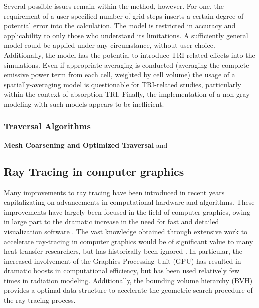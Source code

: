Several possible issues remain within the method, however. For one, the requirement of a user specified number of grid steps inserts a certain degree of potential error into the calculation. 
The model is restricted in accuracy and applicability to only those who understand its limitations. A sufficiently general model could be applied under any circumstance, without user choice.
Additionally, the model has the potential to introduce TRI-related effects into the simulations. 
Even if appropriate averaging is conducted (averaging the complete emissive power term from each cell, weighted by cell volume) the usage of a spatially-averaging model is questionable for TRI-related studies, particularly within the context of absorption-TRI.
Finally, the implementation of a non-gray modeling with such models appears to be inefficient.

\subsubsection{Traversal Algorithms}


\textbf{Mesh Coarsening and Optimized Traversal}
and \citet{Kelm2021TheTransport}
\cite{Nery2011MassivelyTracing,Zeeb2001AnGeometries,Humphrey2015ATracing,Mazumder2006MethodsTransport,Saftly2013UsingNote,Kuczynskia2014RadiationBoundaries}


\subsection{Ray Tracing in computer graphics}
Many improvements to ray tracing have been introduced in recent years capitalizating on advancements in computational hardware and algorithms.
These improvements have largely been focused in the field of computer graphics, owing in large part to the dramatic increase in the need for fast and detailed visualization software \cite{Gupta2020CUDAComputing}. 
The vast knowledge obtained through extensive work to accelerate ray-tracing in computer graphics would be of significant value to many heat transfer researchers, but has historically been ignored \cite{Howell2021TheTransfer}. 
In particular, the increased involvement of the Graphics Processing Unit (GPU) has resulted in dramatic boosts in computational efficiency, but has been used relatively few times in radiation modeling.
Additionally, the bounding volume hierarchy (BVH) provides a optimal data structure to accelerate the geometric search procedure of the ray-tracing process.

